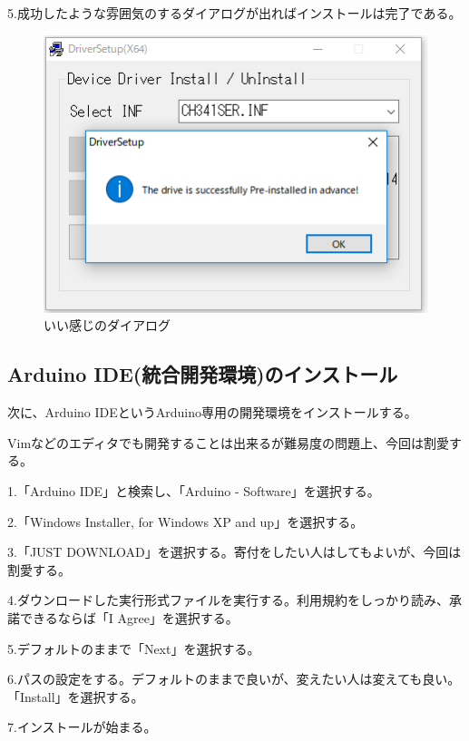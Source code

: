 \documentclass[uplatex]{jsarticle}
\begin{document}
5.成功したような雰囲気のするダイアログが出ればインストールは完了である。
\begin{figure}
    \centering
    \includegraphics[width=13cm]{driver_5.png}
    \caption{いい感じのダイアログ}
\end{figure}
\clearpage
\subsection{Arduino IDE(統合開発環境)のインストール}
次に、Arduino IDEというArduino専用の開発環境をインストールする。

Vimなどのエディタでも開発することは出来るが難易度の問題上、今回は割愛する。

1.「Arduino IDE」と検索し、「Arduino - Software」を選択する。

2.「Windows Installer, for Windows XP and up」を選択する。

3.「JUST DOWNLOAD」を選択する。寄付をしたい人はしてもよいが、今回は割愛する。

4.ダウンロードした実行形式ファイルを実行する。利用規約をしっかり読み、承諾できるならば「I Agree」を選択する。

5.デフォルトのままで「Next」を選択する。

6.パスの設定をする。デフォルトのままで良いが、変えたい人は変えても良い。「Install」を選択する。

7.インストールが始まる。
\end{document}
